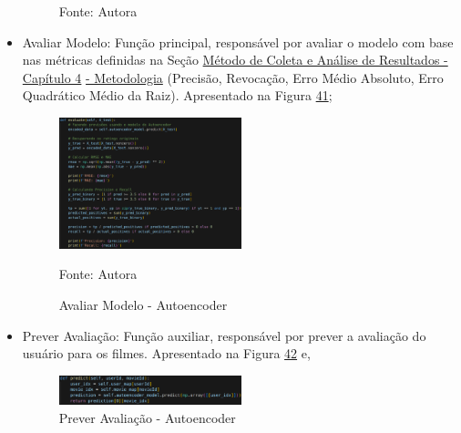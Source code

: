 \begin{itemize}
\begin{figure}[htbp]
        \small Fonte: Autora
    \end{figure}

    \item Avaliar Modelo: Função principal, responsável por avaliar o modelo com base nas métricas definidas na Seção 
    \hyperref[sec:meteanresul]{Método de Coleta e Análise de Resultados - Capítulo 4}
    \hyperref[sec:meteanresul]{ - Metodologia} 
    (Precisão, Revocação, Erro Médio Absoluto, Erro Quadrático Médio da Raiz).
    Apresentado na Figura \hyperref[fig:eval-aut]{41};
    \begin{figure}[htbp]
        \centering
        \caption{Avaliar Modelo - Autoencoder}
        \label{fig:eval-aut}
        
        \vspace{2pt} %
        
        \includegraphics[width=0.5\textwidth]{figuras/eval-aut.eps}
        
        \vspace{2pt} %
        
        \small Fonte: Autora
    \end{figure}

    \item Prever Avaliação: Função auxiliar, responsável por prever a avaliação do usuário para os filmes. Apresentado na
    Figura \hyperref[fig:pred-aut]{42} e,
    \begin{figure}[htbp]
        \centering
        \caption{Prever Avaliação - Autoencoder}
        \label{fig:pred-aut}
        
        \vspace{2pt} %
        
        \includegraphics[width=0.5\textwidth]{figuras/pred-aut.eps}
        

\end{figure}
\end{itemize}
